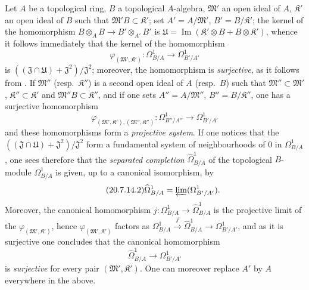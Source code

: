 \begin{env}[20.7.14]
\label{0.20.7.14}
Let $A$ be a topological ring, $B$ a topological $A$-algebra, $\mathfrak{M}'$ an open ideal of $A$, $\mathfrak{K}'$ an open ideal of $B$ such that $\mathfrak{M}'B\subset\mathfrak{K}'$; set $A'=A/\mathfrak{M}'$, $B'=B/\mathfrak{K}'$;
the kernel of the homomorphism $B\otimes_A B\to B'\otimes_{A'} B'$ is $\mathfrak{U}=\operatorname{Im}(\mathfrak{K}'\otimes B+B\otimes\mathfrak{K}')$, whence it follows immediately that the kernel of the homomorphism
\begin{equation}
\tag{20.7.14.1}
  \label{0.20.7.14.1}
  \varphi_{(\mathfrak{M}',\mathfrak{K}')}:\Omega^1_{B/A}\to\Omega^1_{B'/A'}
\end{equation}
is $((\mathfrak{J}\cap\mathfrak{U})+\mathfrak{J}^2)/\mathfrak{J}^2$; moreover, the homomorphism  is \emph{surjective}, as it follows from .
If $\mathfrak{M}''$ (resp.\ $\mathfrak{K}''$) is a second open ideal of $A$ (resp.\ $B$) such that $\mathfrak{M}''\subset\mathfrak{M}'$, $\mathfrak{K}''\subset\mathfrak{K}'$ and $\mathfrak{M}''B\subset\mathfrak{K}''$, and if one sets $A''=A/\mathfrak{M}''$, $B''=B/\mathfrak{K}''$, one has a surjective homomorphism
\[
  \varphi_{(\mathfrak{M}',\mathfrak{K}'),(\mathfrak{M}'',\mathfrak{K}'')}:\Omega^1_{B''/A''}\to\Omega^1_{B'/A'}
\]
and these homomorphisms form a \emph{projective system}.
If one notices that the $((\mathfrak{J}\cap\mathfrak{U})+\mathfrak{J}^2)/\mathfrak{J}^2$ form a fundamental system of neighbourhoods of $0$ in $\Omega^1_{B/A}$, one sees therefore that the \emph{separated completion} $\widehat{\Omega}^1_{B/A}$ of the topological $B$-module $\Omega^1_{B/A}$ is given, up to a canonical isomorphism, by
\begin{equation}
\tag{20.7.14.2}
  \label{0.20.7.14.2}
  \widehat{\Omega}^1_{B/A}=\varprojlim(\Omega^1_{B'/A'}).
\end{equation}
Moreover, the canonical homomorphism $j:\Omega^1_{B/A}\to\widehat{\Omega}^1_{B/A}$ is the projective limit of the $\varphi_{(\mathfrak{M}',\mathfrak{K}')}$, hence $\varphi_{(\mathfrak{M}',\mathfrak{K}')}$ factors as $\Omega^1_{B/A}\xrightarrow{j}\widehat{\Omega}^1_{B/A}\to\Omega^1_{B'/A'}$, and as it is surjective one concludes that the canonical homomorphism
\begin{equation}
\tag{20.7.14.3}
  \label{0.20.7.14.3}
  \widehat{\Omega}^1_{B/A}\to\Omega^1_{B'/A'}
\end{equation}
is \emph{surjective} for every pair $(\mathfrak{M}',\mathfrak{K}')$.
One can moreover replace $A'$ by $A$ everywhere in the above.


\end{env}
